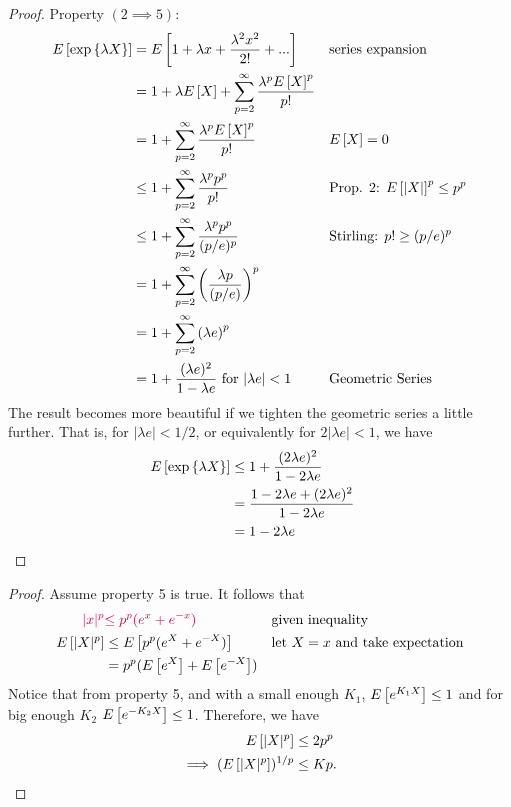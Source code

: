 \begin{proof}
Property $(2 \implies 5):$
\begin{align*}
    E\left[\exp\left\{\lambda X \right\} \right] &= E\left[1 + \lambda x + \frac{\lambda^2 x^2}{2!} + ... \right] && \text{series expansion} \\ 
    &= 1 + \lambda E\left[X \right] + \sum_{p=2}^{\infty} \frac{\lambda^p E\left[X \right]^p}{p!} \\
    &= 1 + \sum_{p=2}^{\infty} \frac{\lambda^p E\left[X \right]^p}{p!} && \text{$E\left[X \right] = 0$} \\ 
    &\leq 1 + \sum_{p=2}^{\infty} \frac{\lambda^p p^p}{p!} && \text{Prop. 2: } E\left[|X| \right]^p \leq p^p \\
    &\leq 1 + \sum_{p=2}^{\infty} \frac{\lambda^p p^p}{(p/e)^p} && \text{Stirling: } p! \geq (p/e)^p \\ 
    &= 1 + \sum_{p=2}^{\infty} \left(\frac{\lambda p}{(p/e)}\right)^p \\
    &= 1 + \sum_{p=2}^{\infty} \left(\lambda e\right)^p \\
    &= 1 + \frac{(\lambda e)^2}{1 - \lambda e} \text{ for $|\lambda e|<1$} && \text{Geometric Series}
\end{align*}
The result becomes more beautiful if we tighten the geometric series a little further. That is, for $|\lambda e| < 1/2$, or equivalently for $2|\lambda e| < 1$, we have
\begin{align*}
    E\left[\exp\left\{\lambda X \right\} \right] &\leq 1 + \frac{(2\lambda e)^2}{1-2\lambda e} && \text{} \\ 
    &= \frac{1 - 2\lambda e +  (2\lambda e)^2}{1-2\lambda e} \\ 
    &= 1 - 2\lambda e
\end{align*}
\end{proof}

\begin{proof}
Assume property 5 is true. It follows that  
\begin{align*}
\textcolor{purple}{|x|^p} &\textcolor{purple}{\leq p^p (e^x + e^{-x})} && \text{given inequality} \\ 
E\left[|X|^p \right] & \leq E\left[p^p(e^X + e^{-X}) \right] && \text{let $X = x$ and take expectation} \\ 
&= p^p (E\left[e^X \right] + E\left[e^{-X} \right]) \\
\end{align*}
Notice that from property 5, and with a small enough $K_1$, $E\left[e^{K_1 X} \right] \leq 1$ and for big enough $K_2$ $E\left[e^{-K_2 X} \right] \leq 1$. Therefore, we have 
\begin{align*}
E\left[|X|^p \right] &\leq 2p^p \\ 
\implies (E\left[|X|^p \right])^{1/p} &\leq K p. \\ 
\end{align*}
\end{proof}






